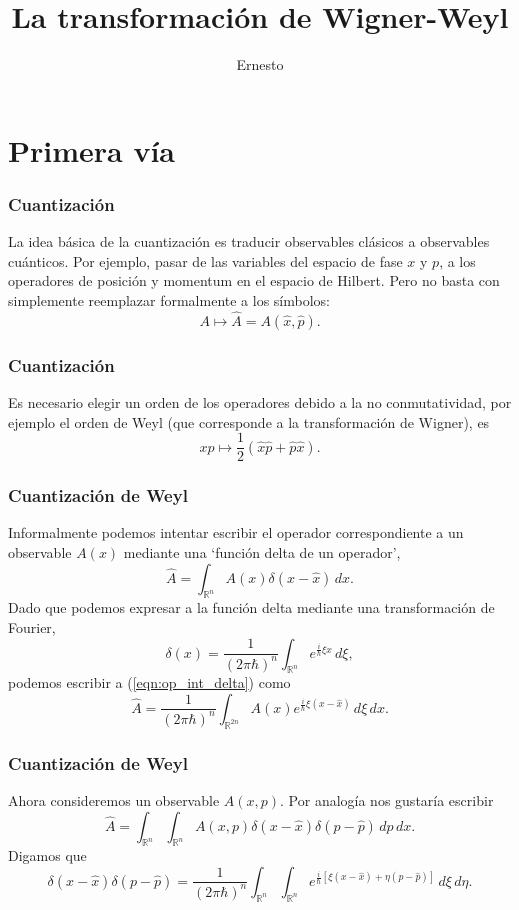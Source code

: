 \documentclass{beamer}
\title{La transformación de Wigner-Weyl}
\author{Ernesto}
\institute{U de G}
\DeclareMathOperator{\R}{\mathbb{R}}
\begin{document}
\frame{\titlepage}

\frame{\tableofcontents}

\section{Primera vía}

\begin{frame}
\frametitle{Cuantización}

La idea básica de la cuantización es traducir observables
clásicos a observables cuánticos. Por ejemplo, pasar de las
variables del espacio de fase $x$ y $p$, a los operadores de
posición y momentum en el espacio de Hilbert. Pero no basta
con simplemente reemplazar formalmente a los símbolos:
\[
  A \mapsto \hat{A} = A(\hat{x},\hat{p}).
\] 
\end{frame}

\begin{frame}
  \frametitle{Cuantización}

  Es necesario elegir un orden de los operadores debido a la
  no conmutatividad, por ejemplo el orden de Weyl (que
  corresponde a la transformación de Wigner), es 
  \[
    xp \mapsto \frac{1}{2} \left( \hat{x}\hat{p} +
    \hat{p}\hat{x} \right). 
  \] 
\end{frame}

\begin{frame}
  \frametitle{Cuantización de Weyl}

  Informalmente podemos intentar escribir el operador
  correspondiente a un observable $A(x)$ mediante una
  `función delta de un operador',
  \begin{equation}
    \label{eqn:op_int_delta}
    \hat{A}
    = \int_{\R^{n}} A(x) \delta(x - \hat{x}) \, dx.
  \end{equation} 
  Dado que podemos expresar a la función delta mediante una
  transformación de Fourier,
  \[
    \delta(x)
    = \frac{1}{(2\pi\hbar)^{n}} 
    \int_{\R^{n}} e^{\frac{i}{\hbar} \xi x} \, d\xi,
  \] 
  podemos escribir a (\ref{eqn:op_int_delta}) como
  \[
    \hat{A}
    = \frac{1}{(2\pi\hbar)^{n}} \int_{\R^{2n}} A(x)
    e^{\frac{i}{\hbar}\xi (x - \hat{x})} \, d\xi \, dx.
  \] 
\end{frame}

\begin{frame}
  \frametitle{Cuantización de Weyl}

  Ahora consideremos un observable $A(x,p)$. Por analogía
  nos gustaría escribir
  \[
    \hat{A}
    = \int_{\R^{n}} \int_{\R^{n}}
    A(x,p) \delta(x - \hat{x}) \delta(p - \hat{p}) \, dp \,
    dx.
  \] 
  Digamos que
  \[
    \delta(x - \hat{x}) \delta(p - \hat{p})
    = \frac{1}{(2\pi\hbar)^{n}} \int_{\R^{n}} \int_{\R^{n}} 
    e^{\frac{i}{\hbar}[\xi(x-\hat{x}) + \eta(p-\hat{p})]} \,
    d\xi \, d\eta.
  \]
\end{frame}
\end{document}

